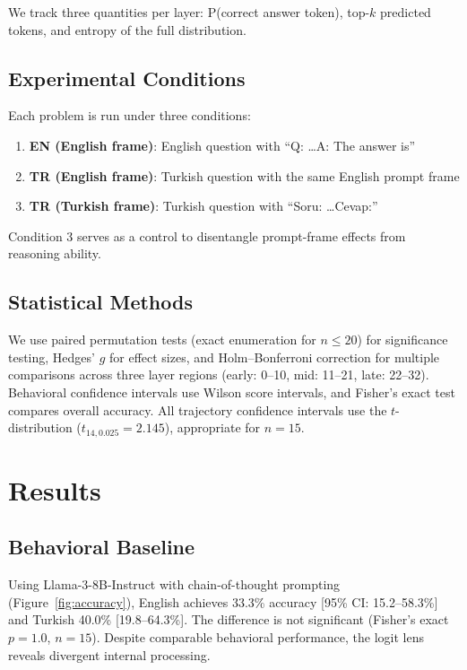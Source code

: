 \documentclass[11pt,a4paper]{article}
\begin{document}
We track three quantities per layer: P(correct answer token), top-$k$ predicted tokens, and entropy of the full distribution.

\subsection{Experimental Conditions}

Each problem is run under three conditions:
\begin{enumerate}[nosep]
    \item \textbf{EN (English frame)}: English question with ``Q: \ldots A: The answer is''
    \item \textbf{TR (English frame)}: Turkish question with the same English prompt frame
    \item \textbf{TR (Turkish frame)}: Turkish question with ``Soru: \ldots Cevap:''
\end{enumerate}
Condition 3 serves as a control to disentangle prompt-frame effects from reasoning ability.

\subsection{Statistical Methods}

We use paired permutation tests (exact enumeration for $n \leq 20$) for significance testing, Hedges' $g$ for effect sizes, and Holm--Bonferroni correction for multiple comparisons across three layer regions (early: 0--10, mid: 11--21, late: 22--32).
Behavioral confidence intervals use Wilson score intervals, and Fisher's exact test compares overall accuracy.
All trajectory confidence intervals use the $t$-distribution ($t_{14, 0.025} = 2.145$), appropriate for $n = 15$.

\section{Results}

\subsection{Behavioral Baseline}

Using Llama-3-8B-Instruct with chain-of-thought prompting (Figure~\ref{fig:accuracy}), English achieves 33.3\% accuracy [95\% CI: 15.2--58.3\%] and Turkish 40.0\% [19.8--64.3\%].
The difference is not significant (Fisher's exact $p = 1.0$, $n = 15$).
Despite comparable behavioral performance, the logit lens reveals divergent internal processing.
\end{document}
